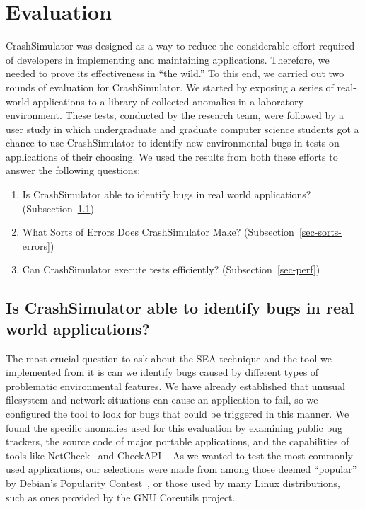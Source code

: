 \section{Evaluation}
\label{SEC:evaluation}

CrashSimulator was designed
as a way to reduce the considerable effort
required of developers
in implementing and maintaining applications.
Therefore,
we needed to prove its effectiveness in ``the wild.''
To this end,
we carried out two rounds of
evaluation for CrashSimulator.
We started by exposing
a series of real-world applications
to a library of collected anomalies in a laboratory environment.
These tests,
conducted by the research team,
were followed by a user study
in which undergraduate and graduate computer science students
got a chance to use CrashSimulator
to identify new environmental bugs
in tests on applications of their choosing.
We used the results from both these efforts
to answer the following questions:

\begin{enumerate}

\item{Is CrashSimulator able to identify bugs in real world applications?
    (Subsection~\ref{sec-env-bugs})}

\item{What Sorts of Errors Does CrashSimulator Make?
    (Subsection~\ref{sec-sorts-errors})}

\item{Can CrashSimulator
      execute tests efficiently? (Subsection~\ref{sec-perf})}

\end{enumerate}

\subsection{Is CrashSimulator able to identify bugs in real world
applications?}
\label{sec-env-bugs}

The most crucial question to ask about the SEA technique and the tool we implemented from it is can we
identify bugs
caused by different types of problematic environmental features.
We have already established
that
unusual filesystem and network situations can cause an application to fail,
so we configured the tool to look
for bugs that could be triggered in this manner.
We found the specific anomalies used for this evaluation
by examining public bug trackers,
the source code of major portable applications, and the capabilities of
tools like NetCheck~\cite{Zhuang_NSDI_2014}
and CheckAPI~\cite{rasley2015detecting}.
As we wanted to test
the most commonly used applications,
our selections were made
from among those deemed ``popular''
by Debian's Popularity Contest~\cite{DebPopCon},
or those used
by many Linux distributions,
such as ones provided
by the GNU Coreutils project.

